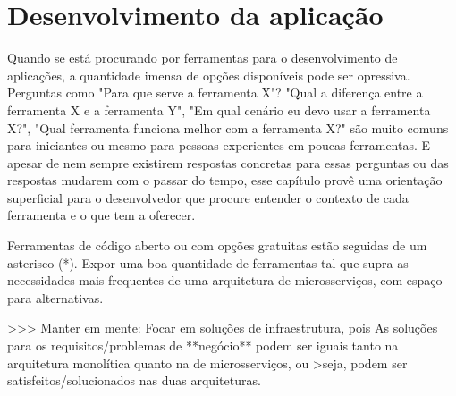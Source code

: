\chapter{Desenvolvimento da aplicação}\label{chapter-ferramentas}



Quando se está procurando por ferramentas para o desenvolvimento de aplicações, a quantidade imensa de opções disponíveis pode ser opressiva. Perguntas como "Para que serve a ferramenta X"? "Qual a diferença entre a ferramenta X e a ferramenta Y", "Em qual cenário eu devo usar a ferramenta X?", "Qual ferramenta funciona melhor com a ferramenta X?" são muito comuns para iniciantes ou mesmo para pessoas experientes em poucas ferramentas. E apesar de nem sempre existirem respostas concretas para essas perguntas ou das respostas mudarem com o passar do tempo, esse capítulo provê uma orientação superficial para o desenvolvedor que procure entender o contexto de cada ferramenta e o que tem a oferecer.

Ferramentas de código aberto ou com opções gratuitas estão seguidas de um asterisco (*).
Expor uma boa quantidade de ferramentas tal que supra as necessidades mais frequentes de uma arquitetura de microsserviços, com espaço para alternativas.

>>> Manter em mente: Focar em soluções de infraestrutura, pois As soluções para os requisitos/problemas de **negócio** podem ser iguais tanto na arquitetura monolítica quanto na de microsserviços, ou >seja, podem ser satisfeitos/solucionados nas duas arquiteturas.

